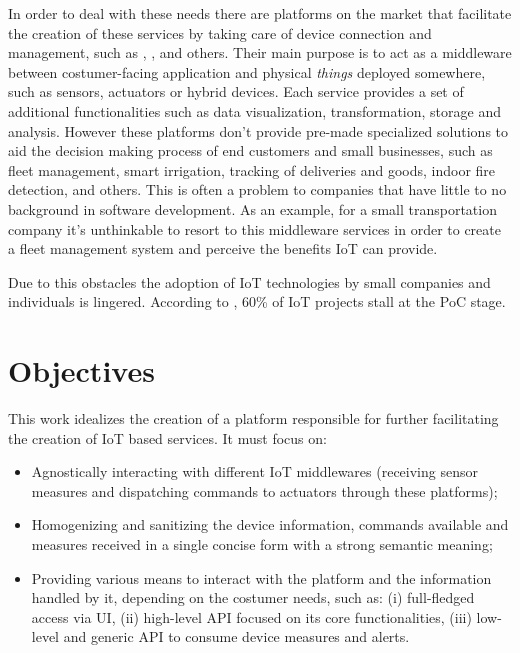 In order to deal with these needs there are platforms on the market that facilitate the creation of these services by taking care of device connection and management, such as , ,  and others. Their main purpose is to act as a middleware between costumer-facing application and physical \textit{things} deployed somewhere, such as sensors, actuators or hybrid devices. Each service provides a set of additional functionalities such as data visualization, transformation, storage and analysis. However these platforms don't provide pre-made specialized solutions to aid the decision making process of end customers and small businesses, such as fleet management, smart irrigation, tracking of deliveries and goods, indoor fire detection, and others. This is often a problem to companies that have little to no background in software development. As an example, for a small transportation company it's unthinkable to resort to this middleware services in order to create a fleet management system and perceive the benefits \gls{IoT} can provide.

Due to this obstacles the adoption of \gls{IoT} technologies by small companies and individuals is lingered. According to \cite{iot-fail}, 60\% of \gls{IoT} projects stall at the \gls{PoC} stage.

\section{Objectives}
\label{sec:introduction:objectives}

This work idealizes the creation of a platform responsible for further facilitating the creation of \gls{IoT} based services. It must focus on:

\begin{itemize}
    \item Agnostically interacting with different \gls{IoT} middlewares (receiving sensor measures and dispatching commands to actuators through these platforms);
    \item Homogenizing and sanitizing the device information, commands available and measures received in a single concise form with a strong semantic meaning;
    \item Providing various means to interact with the platform and the information handled by it, depending on the costumer needs, such as: (i) full-fledged access via \gls{UI}, (ii) high-level \gls{API} focused on its core functionalities, (iii) low-level and generic \gls{API} to consume device measures and alerts.
\end{itemize}

